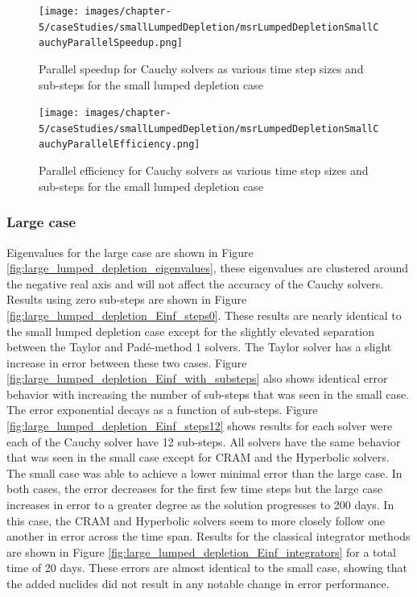 \clearpage

\begin{figure}[p]
    \centering
    \texttt{[image: images/chapter-5/caseStudies/smallLumpedDepletion/msrLumpedDepletionSmallCauchyParallelSpeedup.png]}
    \caption{Parallel speedup for Cauchy solvers as various time step sizes and sub-steps for the small lumped depletion case}
    \label{fig:small_lumped_depletion_cauchy_speedup}
\end{figure}

\clearpage

\begin{figure}[p]
    \centering
    \texttt{[image: images/chapter-5/caseStudies/smallLumpedDepletion/msrLumpedDepletionSmallCauchyParallelEfficiency.png]}
    \caption{Parallel efficiency for Cauchy solvers as various time step sizes and sub-steps for the small lumped depletion case}
    \label{fig:small_lumped_depletion_cauchy_parallel_eff}
\end{figure}

\clearpage


\subsubsection{Large case}
Eigenvalues for the large case are shown in Figure \ref{fig:large_lumped_depletion_eigenvalues}, these eigenvalues are clustered around the negative real axis and will not affect the accuracy of the Cauchy solvers. Results using zero sub-steps are shown in Figure \ref{fig:large_lumped_depletion_Einf_steps0}. These results are nearly identical to the small lumped depletion case except for the slightly elevated separation between the Taylor and Pad\'e-method 1 solvers. The Taylor solver has a slight increase in error between these two cases. Figure \ref{fig:large_lumped_depletion_Einf_with_substeps} also shows identical error behavior with increasing the number of sub-steps that was seen in the small case. The error exponential decays as a function of sub-steps. Figure \ref{fig:large_lumped_depletion_Einf_steps12} shows results for each solver were each of the Cauchy solver have 12 sub-steps. All solvers have the same behavior that was seen in the small case except for CRAM and the Hyperbolic solvers. The small case was able to achieve a lower minimal error than the large case. In both cases, the error decreases for the first few time steps but the large case increases in error to a greater degree as the solution progresses to 200 days. In this case, the CRAM and Hyperbolic solvers seem to more closely follow one another in error across the time span. Results for the classical integrator methods are shown in Figure \ref{fig:large_lumped_depletion_Einf_integrators} for a total time of 20 days. These errors are almost identical to the small case, showing that the added nuclides did not result in any notable change in error performance. 

